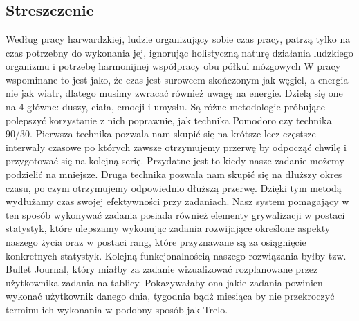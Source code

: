\documentclass[a4paper,11pt]{report}
\begin{document}
\chapter{}
\section{Streszczenie}
Według pracy harwardzkiej, ludzie organizujący sobie czas pracy, patrzą tylko na czas potrzebny do wykonania jej, ignorując holistyczną naturę działania ludzkiego organizmu i potrzebę harmonijnej współpracy obu półkul mózgowych W pracy wspominane to jest jako, że czas jest surowcem skończonym jak węgiel, a energia nie jak wiatr, dlatego musimy zwracać również uwagę na energie. Dzielą się one na 4 główne: duszy, ciała, emocji i umysłu\cite{Harward}. Są różne metodologie próbujące polepszyć korzystanie z nich poprawnie, jak technika Pomodoro\cite{Pomodoro} czy technika 90/30\cite{90/30}. Pierwsza technika pozwala nam skupić się na krótsze lecz częstsze interwały czasowe po których zawsze otrzymujemy przerwę by odpocząć chwilę i przygotować się na kolejną serię. Przydatne jest to kiedy nasze zadanie możemy podzielić na mniejsze. Druga technika pozwala nam skupić się na dłuższy okres czasu, po czym otrzymujemy odpowiednio dłuższą przerwę. Dzięki tym metodą wydłużamy czas swojej efektywności przy zadaniach. Nasz system pomagający w ten sposób wykonywać zadania posiada również elementy grywalizacji\cite{grywalizacja} w postaci statystyk, które ulepszamy wykonując zadania rozwijające określone aspekty naszego życia oraz w postaci rang\cite{rangi}, które przyznawane są za osiągnięcie konkretnych statystyk. Kolejną funkcjonalnością naszego rozwiązania byłby tzw. Bullet Journal, który miałby za zadanie wizualizować rozplanowane przez użytkownika zadania na tablicy. Pokazywałaby ona jakie zadania powinien wykonać użytkownik danego dnia, tygodnia bądź miesiąca by nie przekroczyć terminu ich wykonania w podobny sposób jak Trelo\cite{trelo}. 
\end{document}
